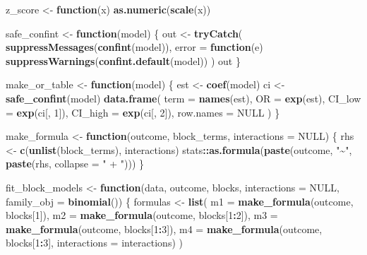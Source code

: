 \documentclass[
]{article}
\newenvironment{Shaded}{\begin{snugshade}}{\end{snugshade}}
\newcommand{\AttributeTok}[1]{\textcolor[rgb]{0.13,0.29,0.53}{#1}}
\newcommand{\ConstantTok}[1]{\textcolor[rgb]{0.56,0.35,0.01}{#1}}
\newcommand{\ControlFlowTok}[1]{\textcolor[rgb]{0.13,0.29,0.53}{\textbf{#1}}}
\newcommand{\DecValTok}[1]{\textcolor[rgb]{0.00,0.00,0.81}{#1}}
\newcommand{\FunctionTok}[1]{\textcolor[rgb]{0.13,0.29,0.53}{\textbf{#1}}}
\newcommand{\NormalTok}[1]{#1}
\newcommand{\OtherTok}[1]{\textcolor[rgb]{0.56,0.35,0.01}{#1}}
\newcommand{\SpecialCharTok}[1]{\textcolor[rgb]{0.81,0.36,0.00}{\textbf{#1}}}
\newcommand{\StringTok}[1]{\textcolor[rgb]{0.31,0.60,0.02}{#1}}
\begin{document}
\begin{Shaded}
\begin{Highlighting}[]
\NormalTok{z\_score }\OtherTok{\textless{}{-}} \ControlFlowTok{function}\NormalTok{(x) }\FunctionTok{as.numeric}\NormalTok{(}\FunctionTok{scale}\NormalTok{(x))}

\NormalTok{safe\_confint }\OtherTok{\textless{}{-}} \ControlFlowTok{function}\NormalTok{(model) \{}
\NormalTok{  out }\OtherTok{\textless{}{-}} \FunctionTok{tryCatch}\NormalTok{(}
    \FunctionTok{suppressMessages}\NormalTok{(}\FunctionTok{confint}\NormalTok{(model)),}
    \AttributeTok{error =} \ControlFlowTok{function}\NormalTok{(e) }\FunctionTok{suppressWarnings}\NormalTok{(}\FunctionTok{confint.default}\NormalTok{(model))}
\NormalTok{  )}
\NormalTok{  out}
\NormalTok{\}}

\NormalTok{make\_or\_table }\OtherTok{\textless{}{-}} \ControlFlowTok{function}\NormalTok{(model) \{}
\NormalTok{  est }\OtherTok{\textless{}{-}} \FunctionTok{coef}\NormalTok{(model)}
\NormalTok{  ci  }\OtherTok{\textless{}{-}} \FunctionTok{safe\_confint}\NormalTok{(model)}
  \FunctionTok{data.frame}\NormalTok{(}
    \AttributeTok{term =} \FunctionTok{names}\NormalTok{(est),}
    \AttributeTok{OR =} \FunctionTok{exp}\NormalTok{(est),}
    \AttributeTok{CI\_low =} \FunctionTok{exp}\NormalTok{(ci[, }\DecValTok{1}\NormalTok{]),}
    \AttributeTok{CI\_high =} \FunctionTok{exp}\NormalTok{(ci[, }\DecValTok{2}\NormalTok{]),}
    \AttributeTok{row.names =} \ConstantTok{NULL}
\NormalTok{  )}
\NormalTok{\}}

\NormalTok{make\_formula }\OtherTok{\textless{}{-}} \ControlFlowTok{function}\NormalTok{(outcome, block\_terms, }\AttributeTok{interactions =} \ConstantTok{NULL}\NormalTok{) \{}
\NormalTok{  rhs }\OtherTok{\textless{}{-}} \FunctionTok{c}\NormalTok{(}\FunctionTok{unlist}\NormalTok{(block\_terms), interactions)}
\NormalTok{  stats}\SpecialCharTok{::}\FunctionTok{as.formula}\NormalTok{(}\FunctionTok{paste}\NormalTok{(outcome, }\StringTok{"\textasciitilde{}"}\NormalTok{, }\FunctionTok{paste}\NormalTok{(rhs, }\AttributeTok{collapse =} \StringTok{" + "}\NormalTok{)))}
\NormalTok{\}}

\NormalTok{fit\_block\_models }\OtherTok{\textless{}{-}} \ControlFlowTok{function}\NormalTok{(data, outcome, blocks, }\AttributeTok{interactions =} \ConstantTok{NULL}\NormalTok{, }\AttributeTok{family\_obj =} \FunctionTok{binomial}\NormalTok{()) \{}
\NormalTok{  formulas }\OtherTok{\textless{}{-}} \FunctionTok{list}\NormalTok{(}
    \AttributeTok{m1 =} \FunctionTok{make\_formula}\NormalTok{(outcome, blocks[}\DecValTok{1}\NormalTok{]),}
    \AttributeTok{m2 =} \FunctionTok{make\_formula}\NormalTok{(outcome, blocks[}\DecValTok{1}\SpecialCharTok{:}\DecValTok{2}\NormalTok{]),}
    \AttributeTok{m3 =} \FunctionTok{make\_formula}\NormalTok{(outcome, blocks[}\DecValTok{1}\SpecialCharTok{:}\DecValTok{3}\NormalTok{]),}
    \AttributeTok{m4 =} \FunctionTok{make\_formula}\NormalTok{(outcome, blocks[}\DecValTok{1}\SpecialCharTok{:}\DecValTok{3}\NormalTok{], }\AttributeTok{interactions =}\NormalTok{ interactions)}
\NormalTok{  )}


\end{Highlighting}
\end{Shaded}
\end{document}
